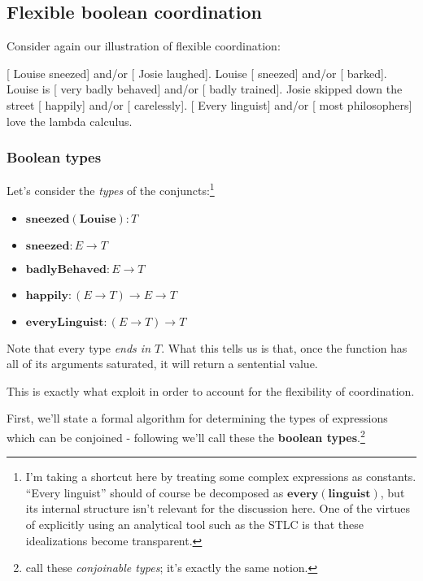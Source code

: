 \documentclass[letterpaper,parskip=half]{scrartcl}
\begin{document}
\subsection{Flexible boolean coordination}
\label{sec:org9d0a1ab}

Consider again our illustration of flexible coordination:

\begin{exe}
  \ex {}[ Louise sneezed] and/or [ Josie laughed].
  \ex Louise [ sneezed] and/or [ barked].
  \ex Louise is [ very badly behaved] and/or [
  badly trained].
  \ex Josie skipped down the street [ happily] and/or
  [ carelessly].
  \ex {}[ Every linguist] and/or [ most philosophers]
  love the lambda calculus.
\end{exe}

\subsubsection{Boolean types}
\label{sec:org74bc57b}

Let's consider the \emph{types} of the conjuncts:\footnote{I'm taking a shortcut here by treating some complex expressions as constants. ``Every linguist'' should of course be decomposed as \(\mathbf{every}(\mathbf{linguist})\), but its internal structure isn't relevant for the discussion here. One of the virtues of explicitly using an analytical tool such as the STLC is that these idealizations become transparent.}

\begin{itemize}
\item \(\mathbf{sneezed}(\mathbf{Louise}): T\)
\item \(\mathbf{sneezed} : E \to T\)
\item \(\mathbf{badlyBehaved} : E \to T\)
\item \(\mathbf{happily} : (E \to T) \to E \to T\)
\item \(\mathbf{everyLinguist} : (E \to T) \to T\)
\end{itemize}

Note that every type \emph{ends in \(T\)}. What this tells us is that, once the function has all of its arguments saturated, it will return a sentential value.

This is exactly what \autocite{ParteeRooth1983} exploit in order to account for the flexibility of coordination.

First, we'll state a formal algorithm for determining the types of expressions which can be conjoined - following \autocite{Winter2001} we'll call these the \textbf{boolean types}.\footnote{\autocite{ParteeRooth1983} call these \emph{conjoinable types}; it's exactly the same notion.}
\end{document}
